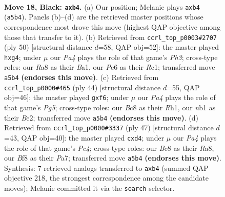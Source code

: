 \documentclass[11pt]{article}
\begin{document}
\clearpage

\begin{figure}[p]\centering
\begin{subfigure}{0.46\textwidth}\centering
\resizebox{\linewidth}{!}{%
\newchessgame
\chessboard[
  setfen={r1b2b1N/2k4p/2p1pnp1/p1P5/1P3P1P/4P3/P7/RNB3K1 b - - 0 18},
  showmover=false,
  pgfstyle=straightmove, color=movearrow, markmove={a5-b4}
]}
\caption{}
\end{subfigure}\hfill
\begin{subfigure}{0.46\textwidth}\centering
\resizebox{\linewidth}{!}{%
\newchessgame
\chessboard[
  setfen={4r1k1/1p2b1p1/p3p3/3nNp2/P5p1/1P2P2P/4KP2/B1R5 w - - 0 26},
  showmover=false,
  pgfstyle=straightmove, color=movearrow, markmove={h3-g4}
]}
\caption{}
\end{subfigure}
\\[4pt]
\begin{subfigure}{0.46\textwidth}\centering
\resizebox{\linewidth}{!}{%
\newchessgame
\chessboard[
  setfen={3r2k1/pp1n2pp/5p2/4p1P1/b1P5/4PP1P/PB2BK2/7R w - - 0 23},
  showmover=false,
  pgfstyle=straightmove, color=movearrow, markmove={g5-f6}
]}
\caption{}
\end{subfigure}\hfill
\begin{subfigure}{0.46\textwidth}\centering
\resizebox{\linewidth}{!}{%
\newchessgame
\chessboard[
  setfen={r4k2/pp4b1/n2p3p/2p2p2/2PP1N2/4P3/PP1B3P/R5K1 b - - 1 24},
  showmover=false,
  pgfstyle=straightmove, color=movearrow, markmove={c5-d4}
]}
\caption{}
\end{subfigure}
\caption{\textbf{Move 18, Black: \texttt{axb4}.} (a) Our position; Melanie plays \texttt{axb4} (\texttt{a5b4}). Panels (b)--(d) are the retrieved master positions whose correspondence most drove this move (highest QAP objective among those that transfer to it). (b) Retrieved from \texttt{ccrl\_top\_p0003\#2707} (ply 50) [structural distance $d$=58, QAP obj=52]: the master played \texttt{hxg4}; under $\mu$ our \emph{Pa4} plays the role of that game's \emph{Ph3}; cross-type roles: our \emph{R}a8 as their \emph{B}a1, our \emph{P}c6 as their \emph{R}c1; transferred move \texttt{a5b4} \textbf{(endorses this move)}. (c) Retrieved from \texttt{ccrl\_top\_p0000\#465} (ply 44) [structural distance $d$=55, QAP obj=46]: the master played \texttt{gxf6}; under $\mu$ our \emph{Pa4} plays the role of that game's \emph{Pg5}; cross-type roles: our \emph{B}c8 as their \emph{R}h1, our \emph{n}b1 as their \emph{B}e2; transferred move \texttt{a5b4} \textbf{(endorses this move)}. (d) Retrieved from \texttt{ccrl\_top\_p0000\#3337} (ply 47) [structural distance $d$=43, QAP obj=40]: the master played \texttt{cxd4}; under $\mu$ our \emph{Pa4} plays the role of that game's \emph{Pc4}; cross-type roles: our \emph{B}c8 as their \emph{R}a8, our \emph{B}f8 as their \emph{P}a7; transferred move \texttt{a5b4} \textbf{(endorses this move)}. Synthesis: 7 retrieved analogs transferred to \texttt{axb4} (summed QAP objective 218, the strongest correspondence among the candidate moves); Melanie committed it via the \texttt{search} selector.}
\label{fig:thought-m35}
\end{figure}
\end{document}
